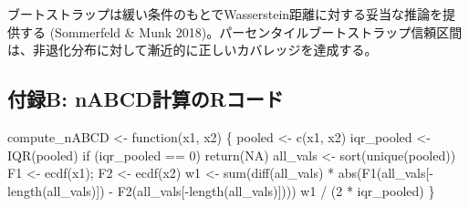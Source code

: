\documentclass[
  a4paper,
  11pt]{ltjsarticle}
\newenvironment{Shaded}{\begin{snugshade}}{\end{snugshade}}
\newcommand{\ConstantTok}[1]{\textcolor[rgb]{0.56,0.35,0.01}{#1}}
\newcommand{\ControlFlowTok}[1]{\textcolor[rgb]{0.00,0.23,0.31}{#1}}
\newcommand{\DecValTok}[1]{\textcolor[rgb]{0.68,0.00,0.00}{#1}}
\newcommand{\FunctionTok}[1]{\textcolor[rgb]{0.28,0.35,0.67}{#1}}
\newcommand{\NormalTok}[1]{\textcolor[rgb]{0.00,0.23,0.31}{#1}}
\newcommand{\OtherTok}[1]{\textcolor[rgb]{0.00,0.23,0.31}{#1}}
\newcommand{\SpecialCharTok}[1]{\textcolor[rgb]{0.37,0.37,0.37}{#1}}
\begin{document}
ブートストラップは緩い条件のもとでWasserstein距離に対する妥当な推論を提供する
(Sommerfeld \& Munk
2018)。パーセンタイルブートストラップ信頼区間は、非退化分布に対して漸近的に正しいカバレッジを達成する。

\subsection*{付録B:
nABCD計算のRコード}\label{ux4ed8ux9332b-nabcdux8a08ux7b97ux306erux30b3ux30fcux30c9}

\begin{Shaded}
\begin{Highlighting}[]
\NormalTok{compute\_nABCD }\OtherTok{\textless{}{-}} \ControlFlowTok{function}\NormalTok{(x1, x2) \{}
\NormalTok{  pooled }\OtherTok{\textless{}{-}} \FunctionTok{c}\NormalTok{(x1, x2)}
\NormalTok{  iqr\_pooled }\OtherTok{\textless{}{-}} \FunctionTok{IQR}\NormalTok{(pooled)}
  \ControlFlowTok{if}\NormalTok{ (iqr\_pooled }\SpecialCharTok{==} \DecValTok{0}\NormalTok{) }\FunctionTok{return}\NormalTok{(}\ConstantTok{NA}\NormalTok{)}
\NormalTok{  all\_vals }\OtherTok{\textless{}{-}} \FunctionTok{sort}\NormalTok{(}\FunctionTok{unique}\NormalTok{(pooled))}
\NormalTok{  F1 }\OtherTok{\textless{}{-}} \FunctionTok{ecdf}\NormalTok{(x1); F2 }\OtherTok{\textless{}{-}} \FunctionTok{ecdf}\NormalTok{(x2)}
\NormalTok{  w1 }\OtherTok{\textless{}{-}} \FunctionTok{sum}\NormalTok{(}\FunctionTok{diff}\NormalTok{(all\_vals) }\SpecialCharTok{*}
    \FunctionTok{abs}\NormalTok{(}\FunctionTok{F1}\NormalTok{(all\_vals[}\SpecialCharTok{{-}}\FunctionTok{length}\NormalTok{(all\_vals)]) }\SpecialCharTok{{-}}
        \FunctionTok{F2}\NormalTok{(all\_vals[}\SpecialCharTok{{-}}\FunctionTok{length}\NormalTok{(all\_vals)])))}
\NormalTok{  w1 }\SpecialCharTok{/}\NormalTok{ (}\DecValTok{2} \SpecialCharTok{*}\NormalTok{ iqr\_pooled)}
\NormalTok{\}}


\end{Highlighting}
\end{Shaded}
\end{document}
